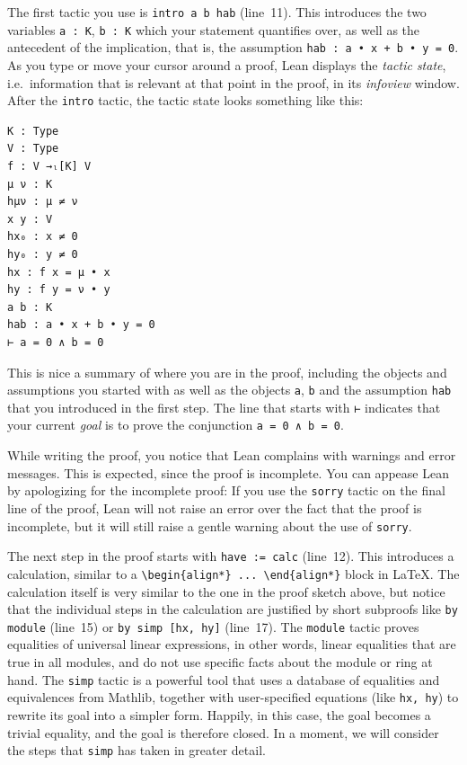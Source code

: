 \documentclass[11pt]{article}
\def\lean{\lstinline[language=lean]}
\begin{document}
The first tactic you use is \lstinline{intro a b hab} (line~11).
This introduces the two variables \lstinline{a : K}, \lstinline{b : K} which your statement quantifies over, as well as the antecedent of the implication, that is,
the assumption \lstinline{hab : a • x + b • y = 0}.
As you type or move your cursor around a proof, Lean displays the \emph{tactic state}, i.e.~information that is relevant at that point in the proof, in its \emph{infoview} window.
After the \lstinline{intro} tactic, the tactic state looks something like this:

\begin{lstlisting}
K : Type
V : Type
f : V →ₗ[K] V
μ ν : K
hμν : μ ≠ ν
x y : V
hx₀ : x ≠ 0
hy₀ : y ≠ 0
hx : f x = μ • x
hy : f y = ν • y
a b : K
hab : a • x + b • y = 0
⊢ a = 0 ∧ b = 0
\end{lstlisting}
This is nice a summary of where you are in the proof, including the objects and assumptions you started with as well as the objects \lstinline{a}, \lstinline{b} and the assumption \lstinline{hab} that you introduced in the first step.
The line that starts with \lstinline{⊢} indicates that your current \emph{goal} is to prove the conjunction \lstinline{a = 0 ∧ b = 0}.

While writing the proof, you notice that Lean complains with warnings and error messages.
This is expected, since the proof is incomplete.
You can appease Lean by apologizing for the incomplete proof:
If you use the \lean"sorry" tactic on the final line of the proof,
Lean will not raise an error over the fact that the proof is incomplete,
but it will still raise a gentle warning about the use of \lean"sorry".

The next step in the proof starts with \lean"have := calc" (line~12).
This introduces a calculation, similar to a \texttt{\textbackslash{}begin\{align*\} ... \textbackslash{}end\{align*\}} block in \LaTeX.
The calculation itself is very similar to the one in the proof sketch above,
but notice that the individual steps in the calculation are justified by short subproofs like \lean"by module" (line~15) or \lean"by simp [hx, hy]" (line~17).
The \lean"module" tactic proves equalities of universal linear expressions,
in other words, linear equalities that are true in all modules, and do not use specific facts about the module or ring at hand.
The \lean"simp" tactic is a powerful tool that uses a database of equalities and equivalences from Mathlib,
together with user-specified equations (like \lean"hx, hy") to rewrite its goal into a simpler form.
Happily, in this case, the goal becomes a trivial equality, and the goal is therefore closed.
In a moment, we will consider the steps that \lean"simp" has taken in greater detail.
\end{document}

